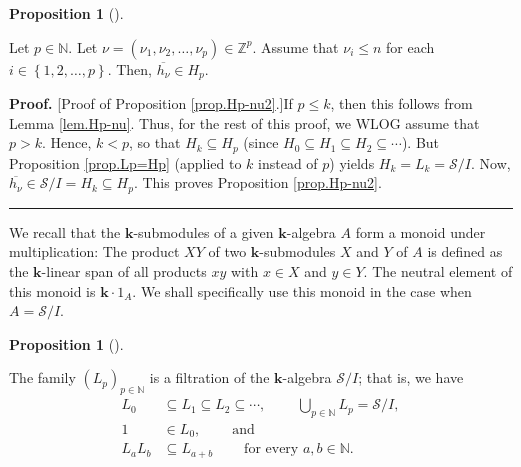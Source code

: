 \documentclass[numbers=enddot,12pt,final,onecolumn,notitlepage]{scrartcl}%
\theoremstyle{definition}
\newtheorem{prop}[theo]{Proposition}
\newenvironment{proposition}[1][]
{\begin{prop}[#1]\begin{leftbar}}
{\end{leftbar}\end{prop}}
\newenvironment{proof}[1][Proof]{\noindent\textbf{#1.} }{\ \rule{0.5em}{0.5em}}
\begin{document}
\begin{proposition}
\label{prop.Hp-nu2}Let $p\in\mathbb{N}$. Let $\nu=\left(  \nu_{1},\nu
_{2},\ldots,\nu_{p}\right)  \in\mathbb{Z}^{p}$. Assume that $\nu_{i}\leq n$
for each $i\in\left\{  1,2,\ldots,p\right\}  $. Then, $\overline{h_{\nu}}\in
H_{p}$.
\end{proposition}

\begin{proof}
[Proof of Proposition \ref{prop.Hp-nu2}.]If $p\leq k$, then this follows from
Lemma \ref{lem.Hp-nu}. Thus, for the rest of this proof, we WLOG assume that
$p>k$. Hence, $k<p$, so that $H_{k}\subseteq H_{p}$ (since $H_{0}\subseteq
H_{1}\subseteq H_{2}\subseteq\cdots$). But Proposition \ref{prop.Lp=Hp}
(applied to $k$ instead of $p$) yields $H_{k}=L_{k}=\mathcal{S}/I$. Now,
$\overline{h_{\nu}}\in\mathcal{S}/I=H_{k}\subseteq H_{p}$. This proves
Proposition \ref{prop.Hp-nu2}.
\end{proof}

We recall that the $\mathbf{k}$-submodules of a given $\mathbf{k}$-algebra $A$
form a monoid under multiplication: The product $XY$ of two $\mathbf{k}%
$-submodules $X$ and $Y$ of $A$ is defined as the $\mathbf{k}$-linear span of
all products $xy$ with $x\in X$ and $y\in Y$. The neutral element of this
monoid is $\mathbf{k}\cdot1_{A}$. We shall specifically use this monoid in the
case when $A=\mathcal{S}/I$.

\begin{proposition}
\label{prop.Lpalg}The family $\left(  L_{p}\right)  _{p\in\mathbb{N}}$ is a
filtration of the $\mathbf{k}$-algebra $\mathcal{S}/I$; that is, we have%
\begin{align}
L_{0}  &  \subseteq L_{1}\subseteq L_{2}\subseteq\cdots
,\ \ \ \ \ \ \ \ \ \ \bigcup_{p\in\mathbb{N}}L_{p}=\mathcal{S}/I,\nonumber\\
1  &  \in L_{0},\ \ \ \ \ \ \ \ \ \ \text{and}\nonumber\\
L_{a}L_{b}  &  \subseteq L_{a+b}\ \ \ \ \ \ \ \ \ \ \text{for every }%
a,b\in\mathbb{N}. \label{eq.prop.Lpalg.3}%
\end{align}

\end{proposition}
\end{document}
